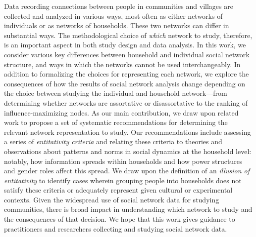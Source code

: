 Data recording connections between people in communities and villages are collected and analyzed in various ways, most often as either networks of individuals or as networks of households. These two networks can differ in substantial ways. The methodological choice of \emph{which} network to study, therefore, is an important aspect in both study design and data analysis. In this work, we consider various key differences between household and individual social network structure, and ways in which the networks cannot be used interchangeably. In addition to formalizing the choices for representing each network, we explore the consequences of how the results of social network analysis change depending on the choice between studying the individual and household network---from determining whether networks are assortative or disassortative to the ranking of influence-maximizing nodes. As our main contribution, we draw upon related work to propose a set of systematic recommendations for determining the relevant network representation to study. Our recommendations include assessing a series of \textit{entitativity criteria} and relating these criteria to theories and observations about patterns and norms in social dynamics at the household level: notably, how information spreads within households and how power structures and gender roles affect this spread. We draw upon the definition of an \textit{illusion of entitativity} to identify cases wherein grouping people into households does not satisfy these criteria or adequately represent given cultural or experimental contexts. Given the widespread use of social network data for studying communities, there is broad impact in understanding which network to study and the consequences of that decision. We hope that this work gives guidance to practitioners and researchers collecting and studying social network data.
